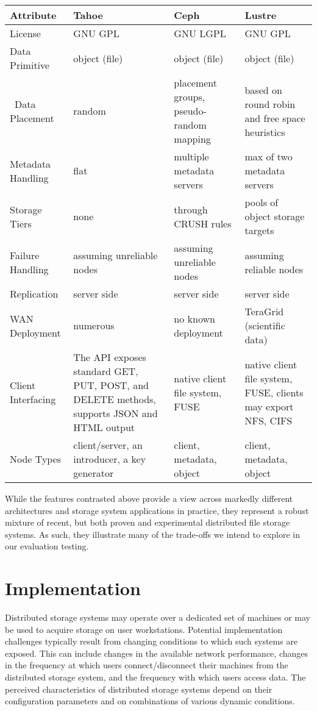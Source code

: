 \documentclass[11pt]{article}
\begin{document}
\begin{center}
    \begin{tabular}{ | l | p{3cm} | p{3cm} | p{3cm} |}
    \hline
    Attribute & Tahoe & Ceph & Lustre \\ \hline
    License & GNU GPL & GNU LGPL & GNU GPL \\ \hline
    Data Primitive & object (file) & object (file) &
    object (file) \\ \hline\
    Data Placement & random & placement groups, pseudo-random mapping &   
    based on round robin and free space heuristics \\ \hline
    Metadata Handling & flat & multiple metadata servers & 
    max of two  metadata servers  \\ \hline
    Storage Tiers & none & through CRUSH rules & pools of object storage
    targets \\ \hline
    Failure Handling & assuming unreliable nodes & assuming unreliable
    nodes & assuming reliable nodes \\ \hline
    Replication & server side & server side & server side \\ \hline
    WAN Deployment & numerous & no known deployment & TeraGrid (scientific
    data) \\ \hline
    Client Interfacing &  The API exposes standard GET, PUT, POST, and
    DELETE methods, supports JSON and HTML output & native client file
    system, FUSE & native client file system, FUSE, clients may export
    NFS, CIFS \\ \hline
    Node Types & client/server, an introducer, a key generator & client,
    metadata, object & client, metadata, object \\ \hline
    \end{tabular}
\end{center}

While the features contrasted above provide a view across markedly different 
architectures and storage system applications in practice, they represent a 
robust mixture of recent, but both proven and experimental distributed file 
storage systems. As such, they illustrate many of the trade-offs we intend 
to explore in our evaluation testing.


\section{Implementation}
Distributed storage systems may operate over a dedicated set of machines 
or may be used to acquire storage on user workstations. Potential 
implementation challenges typically result from changing conditions to 
which such systems are exposed. This can include changes in the 
available network performance, changes in the frequency at which users 
connect/disconnect their machines from the distributed storage system, 
and the frequency with which users access data. The perceived 
characteristics of distributed storage systems depend on their 
configuration parameters and on combinations of various dynamic 
conditions.
\end{document}
